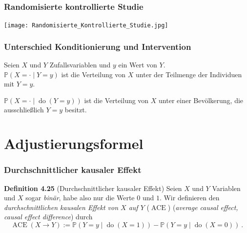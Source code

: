 \documentclass{beamer}
\newcommand{\en}[1]{{\scriptsize(\textit{#1})}}
\newcommand{\Do}{\operatorname{do}}
\newcommand{\ACE}{\operatorname{ACE}}
\newcommand{\klein}[1]{{\scriptsize #1}}
\begin{document}
\begin{frame}
\frametitle{Randomisierte kontrollierte Studie}

\begin{center}
	\texttt{[image: Randomisierte\_Kontrollierte\_Studie.jpg]}
\end{center}
\end{frame}

\begin{frame}
\frametitle{Unterschied Konditionierung und Intervention}

Seien $X$ und $Y$ Zufallsvariablen und $y$ ein Wert von $Y$.\\

$\mathbb{P}(X = \cdot \mid Y = y)$ ist die Verteilung von $X$ unter der Teilmenge der Individuen mit $Y = y$.\\

\vspace*{\baselineskip}
\pause

$\mathbb{P}(X = \cdot \mid \Do(Y = y))$ ist die Verteilung von $X$ unter einer Bevölkerung, die ausschließlich $Y = y$ besitzt.
\end{frame}

\section{Adjustierungsformel}

\begin{frame}
\frametitle{Durchschnittlicher kausaler Effekt}

\begin{block}{\textbf{Definition 4.25} \klein{(Durchschnittlicher kausaler Effekt)}}
Seien $X$ und $Y$ Variablen und $X$ sogar \textit{binär}, habe also nur die Werte $0$ und $1$. Wir definieren den \textit{durchschnittlichen kausalen Effekt von $X$ auf $Y$} ($\ACE$) \en{average causal effect, causal effect difference} durch
\[\ACE(X \rightarrow Y) := \mathbb{P}(Y = y \mid \Do(X = 1)) - \mathbb{P}(Y = y \mid \Do(X = 0))~.\]
\end{block}
\end{frame}
\end{document}
